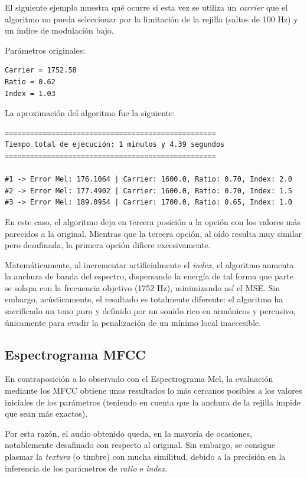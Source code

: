 El siguiente ejemplo muestra qué ocurre si esta vez se utiliza un \textit{carrier} que el algoritmo no pueda seleccionar por la
limitación de la rejilla (saltos de 100 Hz) y un índice de modulación bajo.

Parámetros originales:
\begin{verbatim}
Carrier = 1752.58
Ratio = 0.62
Index = 1.03
\end{verbatim}

La aproximación del algoritmo fue la siguiente:

\begin{verbatim}
==================================================
Tiempo total de ejecución: 1 minutos y 4.39 segundos
==================================================

#1 -> Error Mel: 176.1064 | Carrier: 1600.0, Ratio: 0.70, Index: 2.0
#2 -> Error Mel: 177.4902 | Carrier: 1600.0, Ratio: 0.70, Index: 1.5
#3 -> Error Mel: 189.0954 | Carrier: 1700.0, Ratio: 0.65, Index: 1.0
\end{verbatim}

En este caso, el algoritmo deja en tercera posición a la opción con los valores más parecidos a la original.
Mientras que la tercera opción, al oído resulta muy similar pero desafinada, la primera opción difiere excesivamente.
 
Matemáticamente, al incrementar artificialmente el \textit{index}, el algoritmo aumenta la anchura de banda del espectro, 
dispersando la energía de tal forma que parte se solapa con la frecuencia objetivo (1752 Hz), minimizando así el MSE. Sin embargo, acústicamente, el resultado es totalmente diferente: el algoritmo ha sacrificado un tono puro y definido por un sonido rico en armónicos y percusivo, únicamente 
para evadir la penalización de un mínimo local inaccesible.

\subsection{Espectrograma MFCC}
En contraposición a lo observado con el Espectrograma Mel, la evaluación mediante los MFCC
obtiene unos resultados lo más cercanos posibles
a los valores iniciales de los parámetros (teniendo en cuenta que la anchura de la rejilla impide
que sean más exactos). 

Por esta razón, el audio obtenido queda, en la mayoría de ocasiones,
notablemente desafinado con respecto al original. Sin embargo, se consigue plasmar la \textit{textura} (o timbre) con mucha similitud, debido a la precisión en la inferencia
de los parámetros de \textit{ratio} e \textit{index}.

